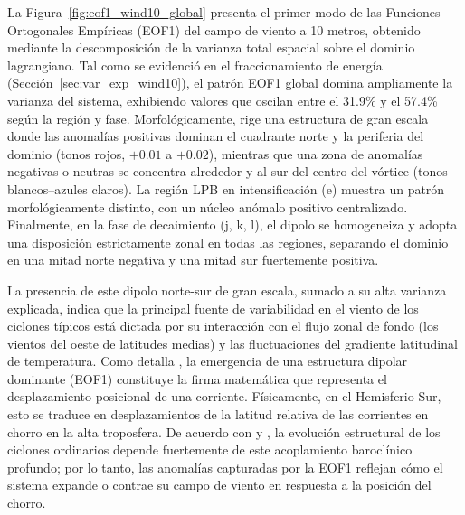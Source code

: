 La Figura~\ref{fig:eof1_wind10_global} presenta el primer modo de las Funciones Ortogonales Empíricas (EOF1) del campo de viento a 10 metros, obtenido mediante la descomposición de la varianza total espacial sobre el dominio lagrangiano. Tal como se evidenció en el fraccionamiento de energía (Sección~\ref{sec:var_exp_wind10}), el patrón EOF1 global domina ampliamente la varianza del sistema, exhibiendo valores que oscilan entre el 31.9\% y el 57.4\% según la región y fase. Morfológicamente, rige una estructura de gran escala donde las anomal\'ias positivas dominan el cuadrante norte y la periferia del dominio (tonos rojos, $+0.01$ a $+0.02$), mientras que una zona de anomal\'ias negativas o neutras se concentra
alrededor y al sur del centro del v\'ortice (tonos blancos--azules claros). La región LPB en intensificación (e) muestra un patrón morfológicamente distinto, con un núcleo anómalo positivo centralizado. Finalmente, en la fase de decaimiento (j, k, l), el dipolo se homogeneiza y adopta una disposición estrictamente zonal en todas las regiones, separando el dominio en una mitad norte negativa y una mitad sur fuertemente positiva.

La presencia de este dipolo norte-sur de gran escala, sumado a su alta varianza explicada, indica que la principal fuente de variabilidad en el viento de los ciclones típicos está dictada por su interacción con el flujo zonal de fondo (los vientos del oeste de latitudes medias) y las fluctuaciones del gradiente latitudinal de temperatura. Como detalla \citet{hannachi2007empirical}, la emergencia de una estructura dipolar dominante (EOF1) constituye la firma matemática que representa el desplazamiento posicional de una corriente. Físicamente, en el Hemisferio Sur, esto se traduce en desplazamientos de la latitud relativa de las corrientes en chorro en la alta troposfera. De acuerdo con \citet{hoskins2005new} y \citet{dossantos2023response}, la evolución estructural de los ciclones ordinarios depende fuertemente de este acoplamiento baroclínico profundo; por lo tanto, las anomalías capturadas por la EOF1 reflejan cómo el sistema expande o contrae su campo de viento en respuesta a la posición del chorro. 

